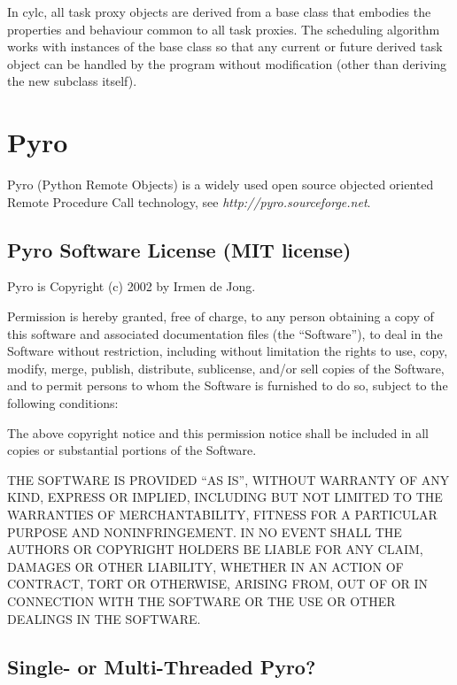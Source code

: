 \documentclass[11pt,a4paper]{article}
\begin{document}
In cylc, all task proxy objects are derived from a base class that 
embodies the properties and behaviour common to all task proxies. 
The scheduling algorithm works with instances of the base class so that
any current or future derived task object can be handled by the program
without modification (other than deriving the new subclass itself).


\pagebreak
\section{Pyro} 
\label{Pyro}

Pyro (Python Remote Objects) is a widely used open source objected
oriented Remote Procedure Call technology, see {\em
http://pyro.sourceforge.net}.

\subsection{Pyro Software License (MIT license)}
\label{PyroSoftwareLicense(MITlicense)}

Pyro is Copyright (c) 2002  by Irmen de Jong.

Permission is hereby granted, free of charge, to any person obtaining a
copy of this software and associated documentation files (the
``Software''), to deal in the Software without restriction, including
without limitation the rights to use, copy, modify, merge, publish,
distribute, sublicense, and/or sell copies of the Software, and to
permit persons to whom the Software is furnished to do so, subject to
the following conditions:

The above copyright notice and this permission notice shall be included
in all copies or substantial portions of the Software.

THE SOFTWARE IS PROVIDED ``AS IS'', WITHOUT WARRANTY OF ANY KIND,
EXPRESS OR IMPLIED, INCLUDING BUT NOT LIMITED TO THE WARRANTIES OF
MERCHANTABILITY, FITNESS FOR A PARTICULAR PURPOSE AND NONINFRINGEMENT.
IN NO EVENT SHALL THE AUTHORS OR COPYRIGHT HOLDERS BE LIABLE FOR ANY
CLAIM, DAMAGES OR OTHER LIABILITY, WHETHER IN AN ACTION OF CONTRACT,
TORT OR OTHERWISE, ARISING FROM, OUT OF OR IN CONNECTION WITH THE
SOFTWARE OR THE USE OR OTHER DEALINGS IN THE SOFTWARE.
                                          
\subsection{Single- or Multi-Threaded Pyro?}
\label{Single-orMulti-ThreadedPyro?}
\end{document}
